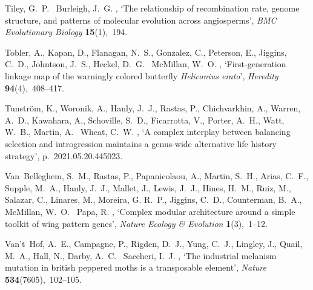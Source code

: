 \documentclass[twocolumn]{bmcart}%
\begin{document}
\begin{backmatter}
\begin{thebibliography}{xx}
Tiley, G.~P. \harvardand\ Burleigh, J.~G.  \harvardyearright , `The relationship of recombination rate, genome
  structure, and patterns of molecular evolution across angiosperms', {\em BMC
  Evolutionary Biology} {\bf 15}(1),~194.

Tobler, A., Kapan, D., Flanagan, N.~S., Gonzalez, C., Peterson, E., Jiggins,
  C.~D., Johntson, J.~S., Heckel, D.~G. \harvardand\ McMillan, W.~O.
  \harvardyearleft 2005\harvardyearright , `First-generation linkage map of the
  warningly colored butterfly \textit{{{Heliconius}} erato}', {\em Heredity}
  {\bf 94}(4),~408--417.

Tunström, K., Woronik, A., Hanly, J.~J., Rastas, P., Chichvarkhin, A., Warren,
  A.~D., Kawahara, A., Schoville, S.~D., Ficarrotta, V., Porter, A.~H., Watt,
  W.~B., Martin, A. \harvardand\ Wheat, C.~W.  \harvardyearleft
  2021\harvardyearright , `A complex interplay between balancing selection and
  introgression maintains a genus-wide alternative life history strategy',
  p.~2021.05.20.445023.

Van~Belleghem, S.~M., Rastas, P., Papanicolaou, A., Martin, S.~H., Arias,
  C.~F., Supple, M.~A., Hanly, J.~J., Mallet, J., Lewis, J.~J., Hines, H.~M.,
  Ruiz, M., Salazar, C., Linares, M., Moreira, G. R.~P., Jiggins, C.~D.,
  Counterman, B.~A., McMillan, W.~O. \harvardand\ Papa, R.  \harvardyearleft
  2017\harvardyearright , `Complex modular architecture around a simple toolkit
  of wing pattern genes', {\em Nature Ecology \& Evolution} {\bf 1}(3),~1--12.

Van't~Hof, A.~E., Campagne, P., Rigden, D.~J., Yung, C.~J., Lingley, J., Quail,
  M.~A., Hall, N., Darby, A.~C. \harvardand\ Saccheri, I.~J.  \harvardyearleft
  2016\harvardyearright , `The industrial melanism mutation in british peppered
  moths is a transposable element', {\em Nature} {\bf 534}(7605),~102--105.


\end{thebibliography}
\end{backmatter}
\end{document}
